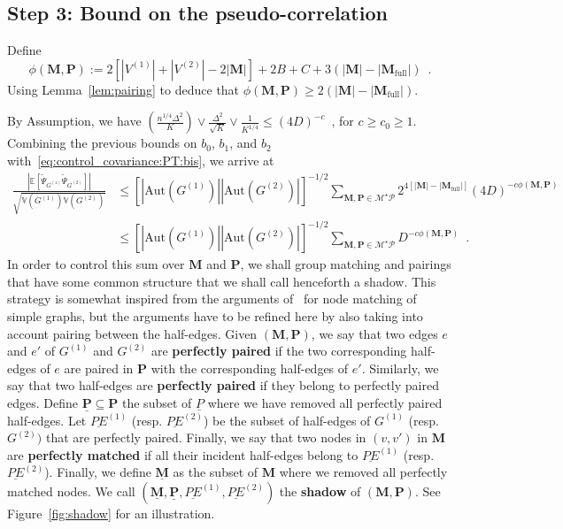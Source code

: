 \documentclass{article}
\begin{document}
\subsection{Step 3: Bound on the pseudo-correlation}

Define 
\begin{equation}\label{eq:definition:psi_P_T}
\phi(\mathbf{M},\mathbf{P}):=   2[|V^{(1)}| + |V^{(2)}| -2 |\mathbf{M}|] + 2B+C +  3(|\mathbf{M}|-|\mathbf{M}_{\mathrm{full}}|)\enspace . 
\end{equation}
Using Lemma~\ref{lem:pairing} to deduce that $\phi(\mathbf{M},\mathbf{P}) \geq 2(|\mathbf{M}|-|\mathbf{M}_{\mathrm{full}}|)$.



By Assumption, we have $(\frac{n^{1/4}\Delta^2}{K})\vee \frac{\Delta^2}{\sqrt{K}}\vee \frac{1}{K^{1/4}}\leq  (4D)^{-c}$\ , 
for $c\geq c_0\geq 1$.  Combining the previous bounds on $b_0$, $b_1$, and $b_2$ with~\eqref{eq:control_covariance:PT:bis}, we arrive at 
    \begin{align}
        \frac{ \left| \mathbb{E}[\widetilde{\Psi}_{G^{(1)}} \widetilde{\Psi}_{G^{(2)}}]\right|}{\sqrt{\mathbb{V}(G^{(1)})\mathbb{V}(G^{(2)})}}&\leq  [|\mathrm{Aut}(G^{(1)})||\mathrm{Aut}(G^{(2)})|]^{-1/2} \sum_{\mathbf{M},\mathbf{P}\in \mathcal{M}^{\star}\mathcal{P}} 2^{4[|\mathbf M|- |\mathbf M_{\mathrm{\mathrm{full}}}|]} (4D)^{- c \phi(\mathbf{M},\mathbf{P}) } \nonumber \\
        &\leq  [|\mathrm{Aut}(G^{(1)})||\mathrm{Aut}(G^{(2)})|]^{-1/2} \sum_{\mathbf{M},\mathbf{P}\in \mathcal{M}^{\star}\mathcal{P}}  D^{- c \phi(\mathbf{M},\mathbf{P}) }\enspace .     \label{eq:control_covariance:PT:3}
\end{align}
In order to control this sum over $\mathbf{M}$ and $\mathbf{P}$, we shall group matching and pairings that have some common structure that we shall call henceforth a shadow. This strategy is somewhat inspired from the arguments of~\cite{CGGV25} for node matching of simple graphs, but the arguments have to be refined here by also taking into account pairing between the half-edges. Given $(\mathbf{M}, \mathbf{P})$, we say that two edges $e$ and $e'$ of $G^{(1)}$ and $G^{(2)}$ are {\bf perfectly paired} if the two corresponding half-edges of $e$  are paired in $\mathbf{P}$  with the corresponding half-edges of $e'$. Similarly, we say that two half-edges are {\bf perfectly paired} if they belong to perfectly paired edges. Define $\underline{\mathbf{P}}\subseteq \mathbf{P}$ the subset of $\underline{P}$ where we have removed all perfectly paired half-edges. Let $\underline{PE}^{(1)}$ (resp. $\underline{PE}^{(2)}$) be the subset of half-edges of $G^{(1)}$ (resp. $G^{(2)})$ that are perfectly paired. Finally, we say that two nodes in $(v,v')$ in $\mathbf{M}$ are {\bf perfectly matched} if all their incident half-edges belong to $\underline{PE}^{(1)}$ (resp. $\underline{PE}^{(2)}$). Finally, we define $\underline{\mathbf{M}}$ as the subset of $\mathbf{M}$ where we removed all perfectly matched nodes. We call $(\underline{\mathbf{M}}, \underline{\mathbf{P}}, \underline{PE}^{(1)},\underline{PE}^{(2)})$ the {\bf shadow} of $(\mathbf{M},\mathbf{P})$. See Figure~\ref{fig:shadow} for an illustration. 
\end{document}
